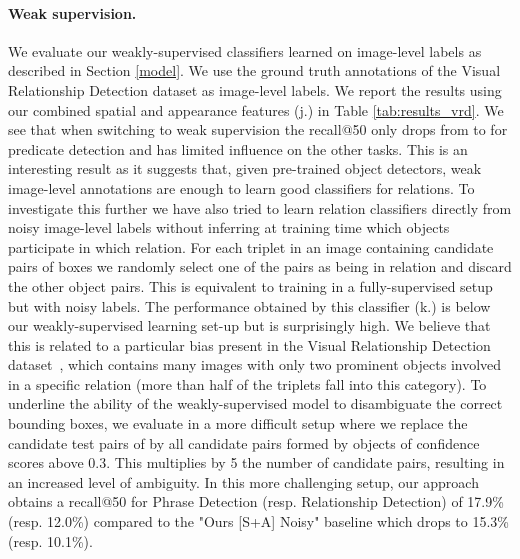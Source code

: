 \documentclass[10pt,twocolumn,letterpaper]{article}
\newcommand{\spaceparagraph}{\vspace{-.35cm}}
\begin{document}
\spaceparagraph
\paragraph{Weak supervision.}
We evaluate our weakly-supervised classifiers  learned on image-level labels as described in Section \ref{model}. We use the ground truth annotations of the Visual Relationship Detection dataset as image-level labels. We report the results using our combined spatial and appearance features (j.) in Table \ref{tab:results_vrd}. We see that when switching to weak supervision the recall@50 only drops from  to  for predicate detection and has limited influence on the other tasks. This is an interesting result as it suggests that, given pre-trained object detectors, weak image-level annotations are enough to learn good classifiers for relations. To investigate this further we have also tried to learn relation classifiers directly from noisy image-level labels without inferring at training time which objects participate in which relation.
For each triplet  in an image containing candidate pairs of boxes  we randomly select one of the pairs as being in relation  and discard the other object pairs. This is equivalent to training in a fully-supervised setup but with noisy labels. 
The performance obtained by this classifier (k.) is  below our weakly-supervised learning set-up but is surprisingly high. We believe that this is related to a particular bias present in the Visual Relationship Detection dataset~\cite{Lu16}, which contains many images with only two prominent objects involved in a specific relation (more than half of the triplets fall into this category). To underline the ability of the weakly-supervised model to disambiguate the correct bounding boxes, we evaluate in a more difficult setup where we replace the candidate test pairs of \cite{Lu16} by all candidate pairs formed by objects of confidence scores above 0.3. This multiplies by 5 the number of candidate pairs, resulting in an increased level of ambiguity. In this more challenging setup, our approach obtains a recall@50 for Phrase Detection (resp. Relationship Detection) of 17.9\% (resp. 12.0\%) compared to the "Ours [S+A] Noisy" baseline which drops to 15.3\% (resp. 10.1\%).
\end{document}
